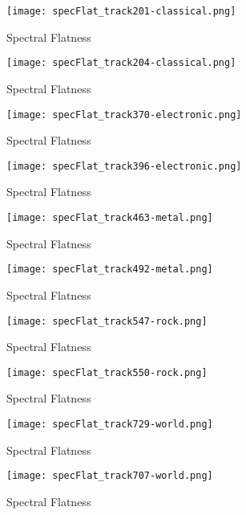 \documentclass{article} %
\begin{document}
\begin{figure}[H]
\centering
\texttt{[image: specFlat\_track201-classical.png]}
\caption{Spectral Flatness}
\label{fig:flat201}
\end{figure}

\begin{figure}[H]
\centering
\texttt{[image: specFlat\_track204-classical.png]}
\caption{Spectral Flatness}
\label{fig:flat204}
\end{figure}

\begin{figure}[H]
\centering
\texttt{[image: specFlat\_track370-electronic.png]}
\caption{Spectral Flatness}
\label{fig:flat370}
\end{figure}


\begin{figure}[H]
\centering
\texttt{[image: specFlat\_track396-electronic.png]}
\caption{Spectral Flatness}
\label{fig:flat396}
\end{figure}


\begin{figure}[H]
\centering
\texttt{[image: specFlat\_track463-metal.png]}
\caption{Spectral Flatness}
\label{fig:flat463}
\end{figure}


\begin{figure}[H]
\centering
\texttt{[image: specFlat\_track492-metal.png]}
\caption{Spectral Flatness}
\label{fig:flat492}
\end{figure}


\begin{figure}[H]
\centering
\texttt{[image: specFlat\_track547-rock.png]}
\caption{Spectral Flatness}
\label{fig:flat547}
\end{figure}


\begin{figure}[H]
\centering
\texttt{[image: specFlat\_track550-rock.png]}
\caption{Spectral Flatness}
\label{fig:flat550}
\end{figure}


\begin{figure}[H]
\centering
\texttt{[image: specFlat\_track729-world.png]}
\caption{Spectral Flatness}
\label{fig:flat729}
\end{figure}


\begin{figure}[H]
\centering
\texttt{[image: specFlat\_track707-world.png]}
\caption{Spectral Flatness}
\label{fig:flat707}
\end{figure}
\end{document}
